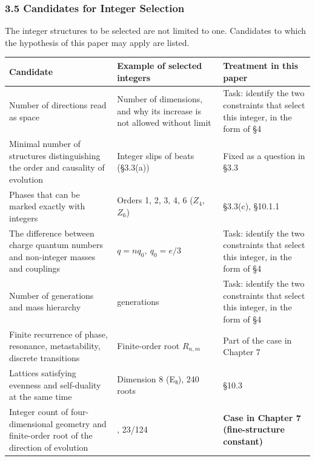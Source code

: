 \documentclass[
  a4paper,
]{article}
\newcounter{none} %
\begin{document}
\subsubsection{3.5 Candidates for Integer
Selection}\label{candidates-for-integer-selection}

The integer structures to be selected are not limited to one. Candidates
to which the hypothesis of this paper may apply are listed.

{\def\LTcaptype{none} %
\begin{longtable}[]{@{}
  >{\raggedright\arraybackslash}p{}
  >{\raggedright\arraybackslash}p{}
  >{\raggedright\arraybackslash}p{}@{}}
\toprule\noalign{}
\begin{minipage}[b]{\linewidth}\raggedright
Candidate
\end{minipage} & \begin{minipage}[b]{\linewidth}\raggedright
Example of selected integers
\end{minipage} & \begin{minipage}[b]{\linewidth}\raggedright
Treatment in this paper
\end{minipage} \\
\midrule\noalign{}
\endhead
\bottomrule\noalign{}
\endlastfoot
Number of directions read as space & Number of dimensions, and why its
increase is not allowed without limit & Task: identify the two
constraints that select this integer, in the form of §4 \\
Minimal number of structures distinguishing the order and causality of
evolution & Integer slips of beats (§3.3(a)) & Fixed as a question in
§3.3 \\
Phases that can be marked exactly with integers & Orders 1, 2, 3, 4, 6
(\(Z_4\), \(Z_6\)) & §3.3(c), §10.1.1 \\
The difference between charge quantum numbers and non-integer masses and
couplings & \(q=nq_0,\ q_0=e/3\) & Task: identify the two constraints
that select this integer, in the form of §4 \\
Number of generations and mass hierarchy & 3 generations & Task:
identify the two constraints that select this integer, in the form of
§4 \\
Finite recurrence of phase, resonance, metastability, discrete
transitions & Finite-order root \(R_{n,m}\) & Part of the case in
Chapter 7 \\
Lattices satisfying evenness and self-duality at the same time &
Dimension 8 (E₈), 240 roots & §10.3 \\
Integer count of four-dimensional geometry and finite-order root of the
direction of evolution & 137, 23/124 & \textbf{Case in Chapter 7
(fine-structure constant)} \\
\end{longtable}
}
\end{document}
